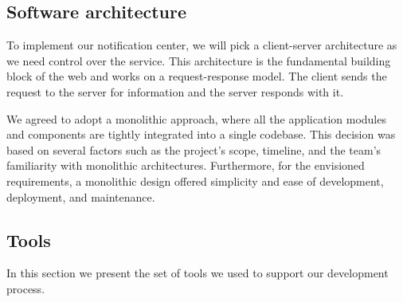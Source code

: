 \subsection{Software architecture}
To implement our notification center, we will pick a client-server architecture as we need control
over the service. This architecture is the fundamental building block of the web and works on a
request-response model. The client sends the request to the server for information and the server
responds with it.

We agreed to adopt a monolithic approach, where all the application modules and components are tightly
integrated into a single codebase. This decision was based on several factors such as the project's
scope, timeline, and the team's familiarity with monolithic architectures. Furthermore, for the envisioned
requirements, a monolithic design offered simplicity and ease of development, deployment, and maintenance.


\subsection{Tools}
In this section we present the set of tools we used to support our development process.

